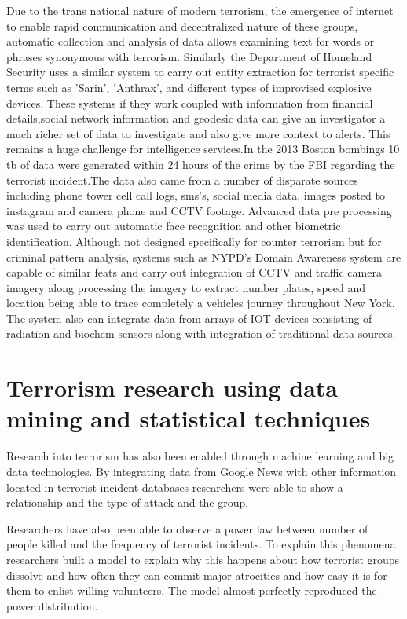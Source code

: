 Due to the trans national nature of  modern terrorism, the emergence of internet to enable rapid communication and decentralized nature of these groups, automatic collection and analysis of data allows examining text for words or phrases synonymous with terrorism. Similarly  the Department of Homeland Security uses a similar system to carry out entity extraction for terrorist specific terms such as 'Sarin', 'Anthrax', and different types of improvised explosive devices. These systems if they work coupled with information from  financial details,social network information and geodesic data can give an investigator a much richer set of data to investigate and also give more context to alerts. This remains a huge challenge for intelligence services.In the 2013 Boston bombings 10 tb of data were generated within 24 hours of the crime by the FBI regarding the terrorist incident.The data also came from a number of disparate sources including phone tower cell call logs, sms's, social media data, images posted to instagram and camera phone and CCTV footage. Advanced data pre processing was used to carry out automatic face recognition and other biometric identification. Although not designed specifically for counter terrorism but for criminal pattern analysis, systems such as NYPD's Domain Awareness system are capable of similar feats and carry out  integration of CCTV and traffic camera imagery along processing the imagery to extract number plates, speed and location being able to trace completely a vehicles journey throughout New York. The system also can integrate data from arrays of IOT devices consisting of radiation and biochem sensors along with integration of traditional data sources.

\section{Terrorism research using data mining and statistical techniques}
Research into terrorism has also been enabled through machine learning and big data technologies. By integrating data from Google News with other information located in terrorist incident databases researchers were able to show a relationship and the type of attack and the group.

Researchers have also been able to observe a power law between number of people killed and the frequency of terrorist incidents. To explain this phenomena researchers built a model to explain why this happens about how terrorist groups  dissolve and how often they can commit major atrocities and how easy it is for them to enlist  willing volunteers. The model almost perfectly reproduced the power distribution.

